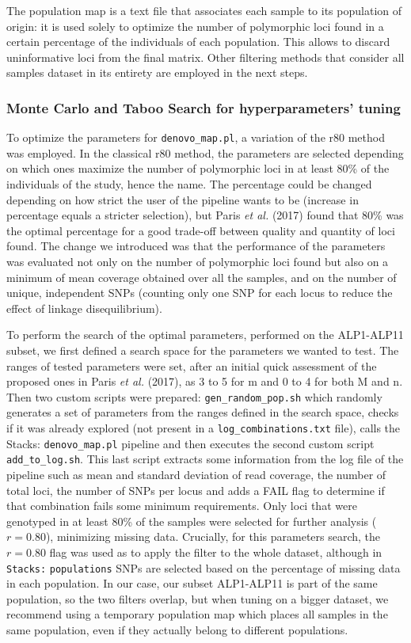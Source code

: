 \documentclass[a4paper, 12pt]{report}
\begin{document}
The population map is a text file that associates each sample to its population of origin: it is used solely to optimize the number of polymorphic loci found in a certain percentage of the individuals of each population. This allows to discard uninformative loci from the final matrix. Other filtering methods that consider all samples dataset in its entirety are employed in the next steps.

\subsubsection{Monte Carlo and Taboo Search for hyperparameters' tuning}
To optimize the parameters for \texttt{denovo\_map.pl}, a variation of the r80 method \parencite{parisLostParameterSpace2017} was employed. In the classical r80 method, the parameters are selected depending on which ones maximize the number of polymorphic loci in at least 80\% of the individuals of the study, hence the name. The percentage could be changed depending on how strict the user of the pipeline wants to be (increase in percentage equals a stricter selection), but Paris \textit{et al.} (2017) found that 80\% was the optimal percentage for a good trade-off between quality and quantity of loci found. The change we introduced was that the performance of the parameters was evaluated not only on the number of polymorphic loci found but also on a minimum of mean coverage obtained over all the samples, and on the number of unique, independent SNPs (counting only one SNP for each locus to reduce the effect of linkage disequilibrium). 

To perform the search of the optimal parameters, performed on the ALP1-ALP11 subset, we first defined a search space for the parameters we wanted to test. The ranges of tested parameters were set, after an initial quick assessment of the proposed ones in Paris \textit{et al.} (2017), as 3 to 5 for m and 0 to 4 for both M and n. Then two custom scripts were prepared: \texttt{gen\_random\_pop.sh} which randomly generates a set of parameters from the ranges defined in the search space, checks if it was already explored (not present in a \texttt{log\_combinations.txt} file), calls the Stacks: \texttt{denovo\_map.pl} pipeline and then executes the second custom script \texttt{add\_to\_log.sh}. This last script extracts some information from the log file of the pipeline such as mean and standard deviation of read coverage, the number of total loci, the number of SNPs per locus and adds a FAIL flag to determine if that combination fails some minimum requirements. Only loci that were genotyped in at least 80\% of the samples were selected for further analysis ($r = 0.80$), minimizing missing data. Crucially, for this parameters search, the $r = 0.80$ flag was used as to apply the filter to the whole dataset, although in \texttt{Stacks:} \texttt{populations} SNPs are selected based on the percentage of missing data in each population. In our case, our subset ALP1-ALP11 is part of the same population, so the two filters overlap, but when tuning on a bigger dataset, we recommend using a temporary population map which places all samples in the same population, even if they actually belong to different populations. 
\end{document}
